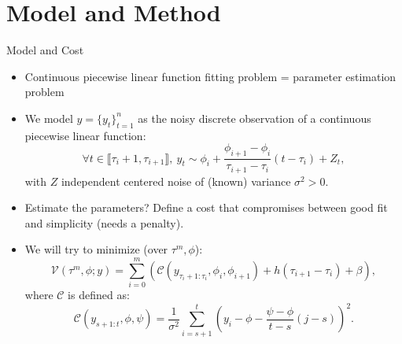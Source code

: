 \documentclass[10pt, xcolor=dvipsnames]{beamer}
\begin{document}

\section{Model and Method}

\begin{frame}{Model and Cost}
\begin{itemize}

\item Continuous piecewise linear function fitting problem = parameter estimation problem

\item We model $y=\{y_t\}_{t=1}^n$ as the noisy discrete observation of a continuous piecewise linear function:
$$
\forall t \in \llbracket \tau_i +1, \tau_{i+1} \rrbracket, \ y_t \sim \phi_i + \frac{\phi_{i+1} - \phi_i}{\tau_{i+1} - \tau_i}(t-\tau_i) + Z_t,
$$
with $Z$ independent centered noise of (known) variance $\sigma^2 >0$.

\item Estimate the parameters? Define a cost that compromises between good fit and simplicity (needs a penalty). 

\item We will try to minimize (over $\tau^m, \phi$):
$$
\mathcal{V}(\tau^m, \phi; y) = \sum_{i=0}^m \left(\mathcal{C}(y_{\tau_i +1:\tau_i}, \phi_i, \phi_{i+1}) + h(\tau_{i+1} - \tau_i) + \beta \right),
$$
where $\mathcal{C}$ is defined as:
$$
\mathcal{C}(y_{s+1:t}, \phi, \psi) = \frac{1}{\sigma^2} \sum_{i=s+1}^t \left( y_i - \phi - \frac{\psi - \phi}{t-s}(j-s) \right)^2.
$$
\end{itemize}
\end{frame}
\end{document}
